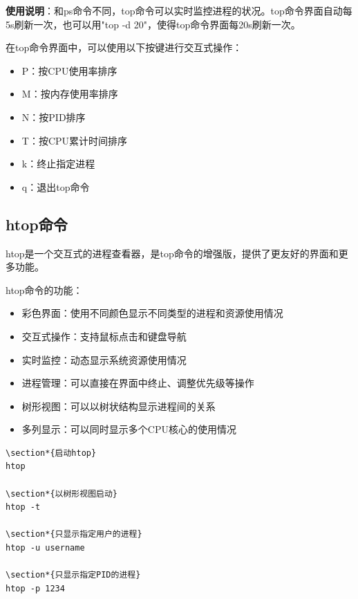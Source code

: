 \documentclass[12pt,UTF8]{ctexbook}
\begin{document}
\textbf{使用说明}：和ps命令不同，top命令可以实时监控进程的状况。top命令界面自动每5s刷新一次，也可以用"top -d 20"，使得top命令界面每20s刷新一次。

在top命令界面中，可以使用以下按键进行交互式操作：
\begin{itemize}
    \item P：按CPU使用率排序
    \item M：按内存使用率排序
    \item N：按PID排序
    \item T：按CPU累计时间排序
    \item k：终止指定进程
    \item q：退出top命令
\end{itemize}

\subsection{htop命令}
htop是一个交互式的进程查看器，是top命令的增强版，提供了更友好的界面和更多功能。

htop命令的功能：
\begin{itemize}
    \item 彩色界面：使用不同颜色显示不同类型的进程和资源使用情况
    \item 交互式操作：支持鼠标点击和键盘导航
    \item 实时监控：动态显示系统资源使用情况
    \item 进程管理：可以直接在界面中终止、调整优先级等操作
    \item 树形视图：可以以树状结构显示进程间的关系
    \item 多列显示：可以同时显示多个CPU核心的使用情况
\end{itemize}

\begin{verbatim}
\section*{启动htop}
htop

\section*{以树形视图启动}
htop -t

\section*{只显示指定用户的进程}
htop -u username

\section*{只显示指定PID的进程}
htop -p 1234
\end{verbatim}
\end{document}
